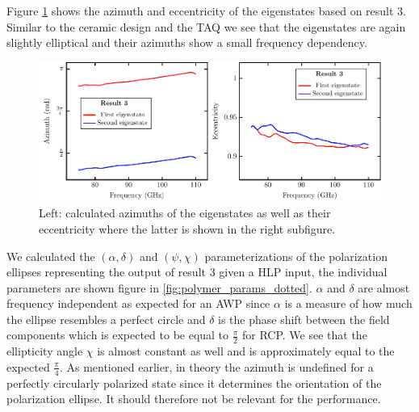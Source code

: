 Figure \ref{fig:polymer_eigenstate_params} shows the azimuth and eccentricity of the eigenstates based on result 3. Similar to the ceramic design and the TAQ we see that the eigenstates are again slightly elliptical and their azimuths show a small frequency dependency.

\begin{figure}[H]
    \centering
    \includegraphics[scale=0.7]{images/results/plots/polymer/eigenstate_params.pdf}
    \caption{Left: calculated azimuths of the eigenstates as well as their eccentricity where the latter is shown in the right subfigure.}
    \label{fig:polymer_eigenstate_params}
\end{figure}

We calculated the $(\alpha, \delta)$ and $(\psi, \chi)$ parameterizations of the polarization ellipses representing the output of result 3 given a HLP input, the individual parameters are shown figure in \ref{fig:polymer_params_dotted}. $\alpha$ and $\delta$ are almost frequency independent as expected for an AWP since $\alpha$ is a measure of how much the ellipse resembles a perfect circle and $\delta$ is the phase shift between the field components which is expected to be equal to $\frac{\pi}{2}$ for RCP. We see that the ellipticity angle $\chi$ is almost constant as well and is approximately equal to the expected $\frac{\pi}{4}$. As mentioned earlier, in theory the azimuth is undefined for a perfectly circularly polarized state since it determines the orientation of the polarization ellipse. It should therefore not be relevant for the performance.

